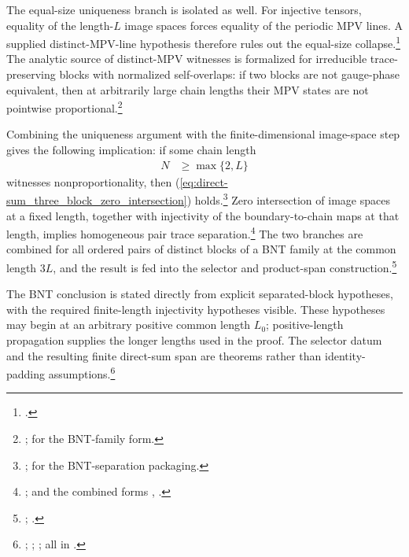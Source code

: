 \documentclass{article}
\begin{document}
The equal-size uniqueness branch is isolated as well. For injective tensors,
equality of the length-$L$ image spaces forces equality of the periodic MPV
lines. A supplied distinct-MPV-line hypothesis therefore rules out the
equal-size collapse.\footnote{%
    .}
The analytic source of distinct-MPV witnesses is formalized for irreducible
trace-preserving blocks with normalized self-overlaps: if two blocks are not
gauge-phase equivalent, then at arbitrarily large chain lengths their MPV
states are not pointwise proportional.\footnote{%
    ;
    for the BNT-family form.}

Combining the uniqueness argument with the finite-dimensional image-space step
gives the following implication: if some chain length
\begin{align}
    N
     & \geq\max\{2,L\}
    \label{eq:direct-sum_nonproportionality_witness_length}
\end{align}
witnesses nonproportionality, then
(\ref{eq:direct-sum_three_block_zero_intersection})
holds.\footnote{%
    ;
    for the BNT-separation packaging.}
Zero intersection of image spaces at a fixed length, together with injectivity
of the boundary-to-chain maps at that length, implies homogeneous pair trace
separation.\footnote{%
    ;
    and the combined forms
    ,
    .}
The two branches are combined for all ordered pairs of distinct blocks of a
BNT family at the common length $3L$, and the result is fed into the selector
and product-span construction.\footnote{%
    ;
    .}

The BNT conclusion is stated directly from explicit separated-block
hypotheses, with the required finite-length injectivity hypotheses visible.
These hypotheses may begin at an arbitrary positive common length $L_0$;
positive-length propagation supplies the longer lengths used in the proof.
The selector datum and the resulting finite direct-sum span are theorems rather
than identity-padding assumptions.\footnote{%
    ;
    ;
    ;
    all in
    .}
\end{document}
